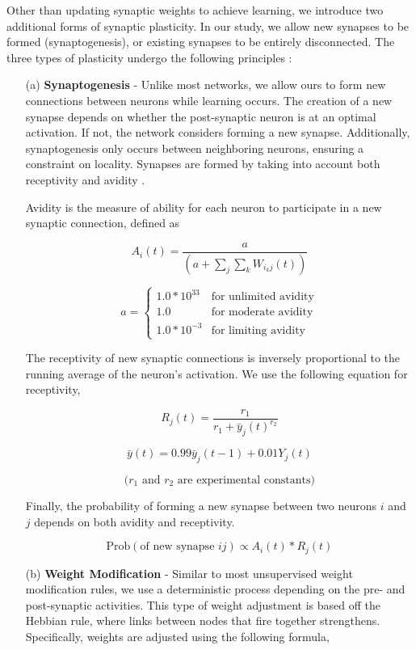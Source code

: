 \documentclass[journal]{./sty/IEEEtran}
\begin{document}
Other than updating synaptic weights to achieve learning, we introduce two additional forms of synaptic plasticity. 
In our study, we allow new synapses to be formed (synaptogenesis), or existing synapses to be entirely disconnected. 
The three types of plasticity undergo the following principles \cite{SynGen:Levy, SynGen2:Levy}:

\begin{itemize}
\item[(a)] {\bf Synaptogenesis} - 
Unlike most networks, we allow ours to form new connections between neurons while learning occurs. 
The creation of a new synapse depends on whether the post-synaptic neuron is at an optimal activation. 
If not, the network considers forming a new synapse.
Additionally, synaptogenesis only occurs between neighboring neurons, ensuring a constraint on locality.
Synapses are formed by taking into account both receptivity and avidity \cite{SynGen:Levy, SynGen2:Levy}.

\vspace{0.3cm}

Avidity is the measure of ability for each neuron to participate in a new synaptic connection, defined as

\[
A_i(t)=\frac{a}{(a + \sum_j\sum_kW_{i_kj}(t))}
\]

\[
a = \left\{
\begin{array}{lr}
  1.0 * 10^{33} & \text{for unlimited avidity}\\
  1.0 & \text{for moderate avidity}\\
  1.0 * 10^{-3} & \text{for limiting avidity}
\end{array}
\right.
\]

The receptivity of new synaptic connections is inversely proportional to the running average of the neuron's activation.
We use the following equation for receptivity,

\[
R_j(t) = \frac{r_1}{r_1 + \bar{y}_j(t)^{r_2}}
\]

\[
\bar{y}(t) = 0.99 \bar{y}_j(t-1) + 0.01 Y_j(t)
\]

\[
\text{(\(r_1\) and \(r_2\) are experimental constants)}
\]

Finally, the probability of forming a new synapse between two neurons \(i\) and \(j\) depends on both avidity and receptivity. 

\[
\text{Prob}(\text{of new synapse } ij ) \propto A_i(t) * R_j(t)
\]

\item[(b)] {\bf Weight Modification} - 
Similar to most unsupervised weight modification rules, we use a deterministic process depending on the pre- and post-synaptic activities.
This type of weight adjustment is based off the Hebbian rule, where links between nodes that fire together strengthens.
Specifically, weights are adjusted using the following formula,


\end{itemize}
\end{document}
